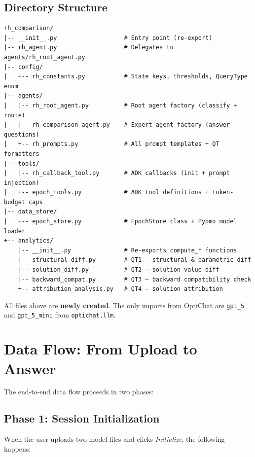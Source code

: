 \documentclass[11pt, a4paper]{article}
\begin{document}
\subsection{Directory Structure}

\begin{lstlisting}
rh_comparison/
|-- __init__.py                   # Entry point (re-export)
|-- rh_agent.py                   # Delegates to agents/rh_root_agent.py
|-- config/
|   +-- rh_constants.py           # State keys, thresholds, QueryType enum
|-- agents/
|   |-- rh_root_agent.py          # Root agent factory (classify + route)
|   |-- rh_comparison_agent.py    # Expert agent factory (answer questions)
|   +-- rh_prompts.py             # All prompt templates + QT formatters
|-- tools/
|   |-- rh_callback_tool.py       # ADK callbacks (init + prompt injection)
|   +-- epoch_tools.py            # ADK tool definitions + token-budget caps
|-- data_store/
|   +-- epoch_store.py            # EpochStore class + Pyomo model loader
+-- analytics/
    |-- __init__.py               # Re-exports compute_* functions
    |-- structural_diff.py        # QT1 — structural & parametric diff
    |-- solution_diff.py          # QT2 — solution value diff
    |-- backward_compat.py        # QT3 — backward compatibility check
    +-- attribution_analysis.py   # QT4 — solution attribution
\end{lstlisting}

All files above are \textcolor{newcode}{\textbf{newly created}}.
The only imports from OptiChat are \texttt{gpt\_5} and \texttt{gpt\_5\_mini}
from \texttt{optichat.llm}.


\section{Data Flow: From Upload to Answer}

The end-to-end data flow proceeds in two phases:

\subsection{Phase 1: Session Initialization}

When the user uploads two model files and clicks \emph{Initialize}, the
following happens:
\end{document}

